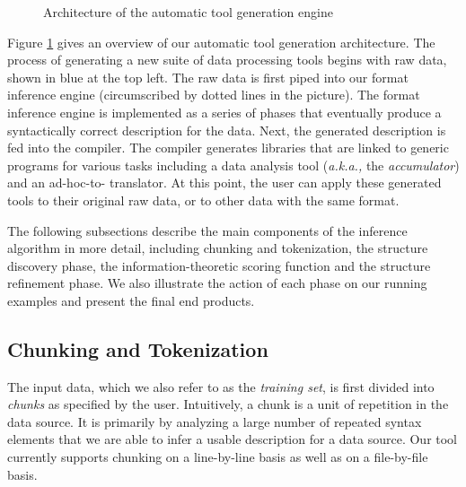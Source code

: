 
\begin{figure}
\begin{center}
\caption{Architecture of the automatic tool generation engine}
\vspace*{-5mm}
\label{fig-archi}
\end{center}
\end{figure}

Figure \ref{fig-archi} gives an overview of our automatic
tool generation architecture. The process of generating a new
suite of data processing tools 
begins with raw data, shown in blue at the top left.  The
raw data is first piped into our format inference engine
(circumscribed by dotted lines in the picture).  The
format inference engine is implemented as a series of phases that 
eventually produce a syntactically correct \pads{} description
for the data.  Next, the generated \pads{} description is fed into the 
\pads{} compiler.  The compiler generates libraries that are linked to generic
programs for various tasks including a data analysis tool
({\em a.k.a.,} the {\em accumulator}) and an ad-hoc-to-\xml{} translator.
At this point, the user can apply these generated tools to their original 
raw data, or to other data with the same format.  

The following subsections describe the main components of the
inference algorithm in more detail, including chunking and
tokenization, the structure discovery phase, the information-theoretic
scoring function and the structure refinement phase.  We also
illustrate the action of each phase on our running examples and
present the final end products.

\subsection{Chunking and Tokenization}

The input data, which we also refer to as the {\em training set}, is first
divided into {\em chunks} as specified by the user.  Intuitively, a chunk
is a unit of repetition in the data source.  It is primarily by analyzing
a large number of repeated syntax elements that we are able to infer a usable
description for a data source.  Our tool currently supports
chunking on a line-by-line basis as well as on a file-by-file basis.  

